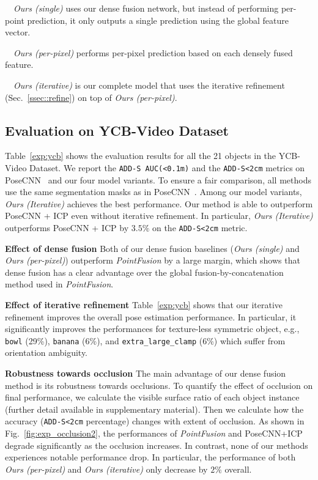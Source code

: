 \documentclass[10pt,twocolumn,letterpaper]{article}
\begin{document}
\noindent~\textbullet~\textit{Ours (single)} uses our dense fusion network, but instead of performing per-point prediction, it only outputs a single prediction using the global feature vector.

\noindent~\textbullet~\textit{Ours (per-pixel)} performs per-pixel prediction based on each densely fused feature.

\noindent~\textbullet~\textit{Ours (iterative)} is our complete model that uses the iterative refinement (Sec.~\ref{ssec::refine}) on top of \textit{Ours (per-pixel)}.

\subsection{Evaluation on YCB-Video Dataset}
\label{sec:eval_ycb}

Table~\ref{exp:ycb} shows the evaluation results for all the 21 objects in the YCB-Video Dataset. We report the \texttt{ADD-S AUC(<0.1m)} and the \texttt{ADD-S<2cm} metrics on PoseCNN~\cite{xiang2017posecnn} and our four model variants.  To ensure a fair comparison, all methods use the same segmentation masks as in PoseCNN~\cite{xiang2017posecnn}. Among our model variants, \textit{Ours (Iterative)} achieves the best performance. Our method is able to outperform PoseCNN + ICP\cite{xiang2017posecnn} even without iterative refinement. In particular, \textit{Ours (Iterative)} outperforms PoseCNN + ICP by $3.5\%$ on the \texttt{ADD-S<2cm} metric.

\noindent\textbf{Effect of dense fusion} Both of our dense fusion baselines (\textit{Ours (single)} and \textit{Ours (per-pixel)}) outperform \textit{PointFusion} by a large margin, which shows that dense fusion has a clear advantage over the global fusion-by-concatenation method used in \textit{PointFusion}. 

\noindent\textbf{Effect of iterative refinement} Table~\ref{exp:ycb} shows that our iterative refinement improves the overall pose estimation performance. In particular, it significantly improves the performances for texture-less symmetric object, e.g., \texttt{bowl} (29\%), \texttt{banana} (6\%), and \texttt{extra\_large\_clamp} (6\%) which suffer from orientation ambiguity.

\noindent\textbf{Robustness towards occlusion} The main advantage of our dense fusion method is its robustness towards occlusions. To quantify the effect of occlusion on final performance, we calculate the visible surface ratio of each object instance (further detail available in supplementary material). Then we calculate how the accuracy (\texttt{ADD-S<2cm} percentage) changes with extent of occlusion. As shown in Fig.~\ref{fig:exp_occlusion2}, the performances of \textit{PointFusion} and PoseCNN+ICP degrade significantly as the occlusion increases. In contrast, none of our methods experiences notable performance drop. In particular, the performance of both \textit{Ours (per-pixel)} and \textit{Ours (iterative)} only decrease by $2\%$ overall.
\end{document}

